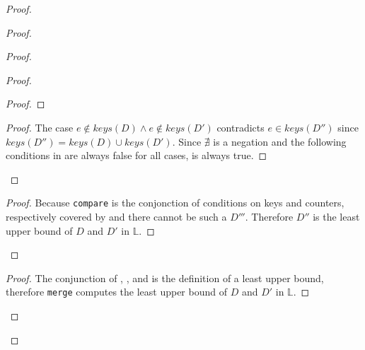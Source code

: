 \documentclass[9pt, oneside]{article}   	%
\begin{document}
\begin{proof}
\begin{proof}
\begin{proof}
\begin{proof}
\begin{proof}
				\end{proof}
				
				\qedstep
				\begin{proof}
					The case $e \notin \textit{keys}(D) \wedge e \notin \textit{keys}(D')$ contradicts $e \in \textit{keys}(D'')$ since $\textit{keys}(D'') = \textit{keys}(D) \cup \textit{keys}(D')$. Since $\nexists$ is a negation and the following conditions in  are always false for all cases,  is always true.
				\end{proof}
			\end{proof}
			
			\qedstep
			\begin{proof}
				Because \texttt{compare} is the conjonction of conditions on keys and counters, respectively covered by  and  there cannot be such a $D'''$. Therefore $D''$ is the least upper bound of $D$ and $D'$ in $\mathds{L}$.
			\end{proof}
		\end{proof}
		
		\qedstep
		\begin{proof}
			The conjunction of , , and  is the definition of a least upper bound, therefore  \texttt{merge} computes the least upper bound of $D$ and $D'$ in $\mathds{L}$.
		\end{proof}	
	\end{proof}
	

\end{proof}
\end{document}
